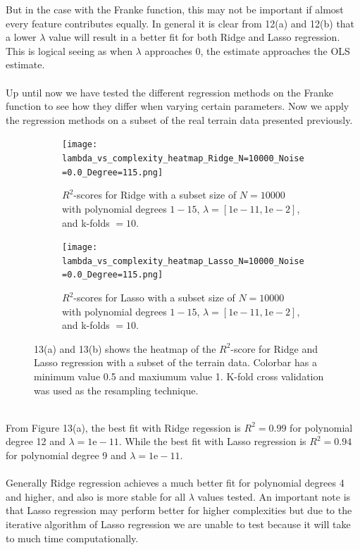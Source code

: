 \documentclass[a4paper,twocolumn]{article}
\begin{document}
But in the case with the Franke function, this may not be important if almost every feature contributes equally. In general it is clear from 12(a) and 12(b) that a lower $\lambda$ value will result in a better fit for both Ridge and Lasso regression. This is logical seeing as when $\lambda$ approaches 0, the estimate approaches the OLS estimate.\\
\\
\noindent Up until now we have tested the different regression methods on the Franke function to see how they differ when varying certain parameters. Now we apply the regression methods on a subset of the real terrain data presented previously.
\begin{figure}[ht]
    \centering
    \begin{subfigure}[b]{0.9\columnwidth}
        \texttt{[image: lambda\_vs\_complexity\_heatmap\_Ridge\_N=10000\_Noise=0.0\_Degree=115.png]}
        \caption{$R^{2}$-scores for Ridge with a subset size of $N=10000$ with polynomial degrees $1- 15$, $\lambda = [1\textrm{e}-11, 1\textrm{e}-2]$, and k-folds $= 10$.}
    \end{subfigure}
    
    \begin{subfigure}[b]{0.9\columnwidth}
        \texttt{[image: lambda\_vs\_complexity\_heatmap\_Lasso\_N=10000\_Noise=0.0\_Degree=115.png]}
        \caption{$R^{2}$-scores for Lasso with a subset size of $N=10000$ with polynomial degrees $1- 15$, $\lambda = [1\textrm{e}-11, 1\textrm{e}-2]$, and k-folds $= 10$.}
    \end{subfigure}
    \caption{13(a) and 13(b) shows the heatmap of the $R^{2}$-score for Ridge and Lasso regression with a subset of the terrain data. Colorbar has a minimum value 0.5 and maxiumum value 1. K-fold cross validation was used as the resampling technique.}
\end{figure}\\
From Figure 13(a), the best fit with Ridge regession is $R^{2}=0.99$ for polynomial degree 12 and $\lambda = 1\textrm{e}-11$. While the best fit with Lasso regression is $R^{2} = 0.94$ for polynomial degree 9 and $\lambda = 1\textrm{e}-11$. \\
\\
Generally Ridge regression achieves a much better fit for polynomial degrees 4 and higher, and also is more stable for all $\lambda$ values tested. An important note is that Lasso regression may perform better for higher complexities but due to the iterative algorithm of Lasso regression we are unable to test because it will take to much time computationally.\\
\end{document}
